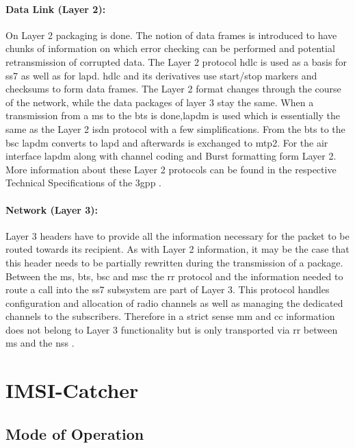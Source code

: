 \paragraph{Data Link (Layer 2):} On Layer 2 packaging is done.
The notion of data frames is introduced to have chunks of information on which error checking can be performed and potential retransmission of corrupted data.
The Layer 2 protocol \gls{hdlc} is used as a basis for \gls{ss7} as well as for \gls{lapd}.
\gls{hdlc} and its derivatives use start/stop markers and checksums to form data frames.
The Layer 2 format changes through the course of the network, while the data packages of layer 3 stay the same.
When a transmission from a \gls{ms} to the \gls{bts} is done,\gls{lapdm} is used which is essentially the same as the Layer 2 \gls{isdn} protocol with a few simplifications.
From the \gls{bts} to the \gls{bsc} \gls{lapdm} converts to \gls{lapd} and afterwards is exchanged to \gls{mtp2}.
For the air interface \gls{lapdm} along with channel coding and Burst formatting form Layer 2.
More information about these Layer 2 protocols can be found in the respective Technical Specifications of the \gls{3gpp} \cite{3gpp_ts_0405,3gpp_ts_0406}.

\paragraph{Network (Layer 3):} Layer 3 headers have to provide all the information necessary for the packet to be routed towards its recipient.
As with Layer 2 information, it may be the case that this header needs to be partially rewritten during the transmission of a package.
Between the \gls{ms}, \gls{bts}, \gls{bsc} and \gls{msc} the \gls{rr} protocol and the information needed to route a call into the \gls{ss7} subsystem are part of Layer 3.
This protocol handles configuration and allocation of radio channels as well as managing the dedicated channels to the subscribers.
Therefore in a strict sense \gls{mm} and \gls{cc} information does not belong to Layer 3 functionality but is only transported via \gls{rr} between \gls{ms} and the \gls{nss} \cite{protocols1999}.

\section{IMSI-Catcher}
\label{sec:catcher}
\subsection{Mode of Operation}
